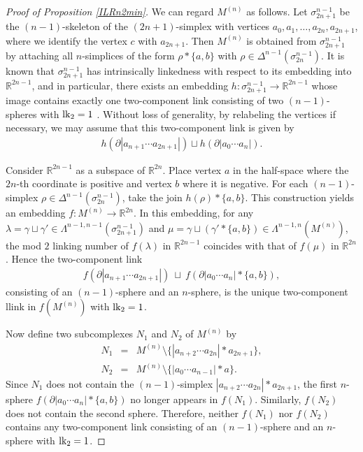 \documentclass{amsart}
\theoremstyle{definition}
\theoremstyle{remark}
\numberwithin{equation}{section}
\begin{document}
\begin{proof}[Proof of Proposition \ref{ILRn2min}]
We can regard $M^{(n)}$ as follows. Let $\sigma_{2n+1}^{n-1}$ be the $(n-1)$-skeleton of the $(2n+1)$-simplex with vertices $a_0,a_1,\dots,a_{2n},a_{2n+1}$, where we identify the vertex $c$ with $a_{2n+1}$. Then $M^{(n)}$ is obtained from $\sigma_{2n+1}^{n-1}$ by attaching all $n$-simplices of the form $\rho * \{a,b\}$ with $\rho \in \varDelta^{n-1}(\sigma_{2n}^{n-1})$. It is known that $\sigma_{2n+1}^{n-1}$ has intrinsically linkedness with respect to its embedding into $\mathbb{R}^{2n-1}$, and in particular, there exists an embedding $h \colon \sigma_{2n+1}^{n-1} \to \mathbb{R}^{2n-1}$ whose image contains exactly one two-component link consisting of two $(n-1)$-spheres with ${\rm lk}_2 = 1$ \cite{T00}. Without loss of generality, by relabeling the vertices if necessary, we may assume that this two-component link is given by 
\begin{eqnarray*}
h(\partial |a_{n+1} \cdots a_{2n+1}|)\sqcup h(\partial |a_0 \cdots a_n|).
\end{eqnarray*}

Consider $\mathbb{R}^{2n-1}$ as a subspace of $\mathbb{R}^{2n}$. Place vertex $a$ in the half-space where the $2n$-th coordinate is positive and vertex $b$ where it is negative. For each $(n-1)$-simplex $\rho \in \varDelta^{n-1}(\sigma_{2n}^{n-1})$, take the join $h(\rho) * \{a,b\}$. This construction yields an embedding $f \colon M^{(n)} \to \mathbb{R}^{2n}$. In this embedding, for any $\lambda = \gamma \sqcup \gamma' \in \Lambda^{n-1,n-1}(\sigma_{2n+1}^{n-1})$ and $\mu = \gamma \sqcup (\gamma' * \{a,b\}) \in \Lambda^{n-1,n}(M^{(n)})$, the mod $2$ linking number of $f(\lambda)$ in $\mathbb{R}^{2n-1}$ coincides with that of $f(\mu)$ in $\mathbb{R}^{2n}$. Hence the two-component link
\begin{eqnarray*}
f(\partial |a_{n+1} \cdots a_{2n+1}|) \ \sqcup \ f(\partial |a_0 \cdots a_n| * \{a,b\}),
\end{eqnarray*}
consisting of an $(n-1)$-sphere and an $n$-sphere, is the unique two-component llink in $f(M^{(n)})$ with ${\rm lk}_2 = 1$.

Now define two subcomplexes $N_1$ and $N_2$ of $M^{(n)}$ by
\begin{eqnarray*}
N_1 &=& M^{(n)} \setminus \bigl\{ |a_{n+2} \cdots a_{2n}| * a_{2n+1} \bigr\}, \\
N_2 &=& M^{(n)} \setminus \bigl\{ |a_0 \cdots a_{n-1}| * a \bigr\}.
\end{eqnarray*}
Since $N_1$ does not contain the $(n-1)$-simplex $|a_{n+2} \cdots a_{2n}| * a_{2n+1}$, the first $n$-sphere $f(\partial |a_0 \cdots a_n| * \{a,b\})$ no longer appears in $f(N_1)$. Similarly, $f(N_2)$ does not contain the second sphere. Therefore, neither $f(N_1)$ nor $f(N_2)$ contains any two-component link consisting of an $(n-1)$-sphere and an $n$-sphere with ${\rm lk}_2 = 1$.


\end{proof}
\end{document}
